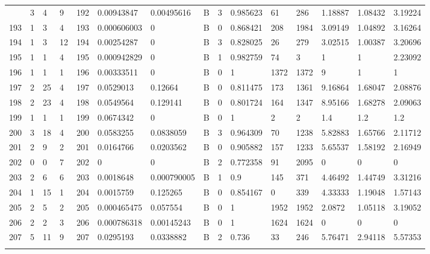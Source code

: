 \begin{latin}
\begin{longtable}{lllllllllllllll}
\begin{comment}
	192 & 3  & 4   & 9  & 192 & 0.00943847     & 0.00495616     & B & 3  & 0.985623 & 61   & 286  & 1.18887 & 1.08432 & 3.19224 \\
	193 & 1  & 3   & 4  & 193 & 0.000606003    & 0              & B & 0  & 0.868421 & 208  & 1984 & 3.09149 & 1.04892 & 3.16264 \\
	194 & 1  & 3   & 12 & 194 & 0.00254287     & 0              & B & 3  & 0.828025 & 26   & 279  & 3.02515 & 1.00387 & 3.20696 \\
	195 & 1  & 1   & 4  & 195 & 0.000942829    & 0              & B & 1  & 0.982759 & 74   & 3    & 1       & 1       & 2.23092 \\
	196 & 1  & 1   & 1  & 196 & 0.00333511     & 0              & B & 0  & 1        & 1372 & 1372 & 9       & 1       & 1       \\
	197 & 2  & 25  & 4  & 197 & 0.0529013      & 0.12664        & B & 0  & 0.811475 & 173  & 1361 & 9.16864 & 1.68047 & 2.08876 \\
	198 & 2  & 23  & 4  & 198 & 0.0549564      & 0.129141       & B & 0  & 0.801724 & 164  & 1347 & 8.95166 & 1.68278 & 2.09063 \\
	199 & 1  & 1   & 1  & 199 & 0.0674342      & 0              & B & 0  & 1        & 2    & 2    & 1.4     & 1.2     & 1.2     \\
	200 & 3  & 18  & 4  & 200 & 0.0583255      & 0.0838059      & B & 3  & 0.964309 & 70   & 1238 & 5.82883 & 1.65766 & 2.11712 \\
	201 & 2  & 9   & 2  & 201 & 0.0164766      & 0.0203562      & B & 0  & 0.905882 & 157  & 1233 & 5.65537 & 1.58192 & 2.16949 \\
	202 & 0  & 0   & 7  & 202 & 0              & 0              & B & 2  & 0.772358 & 91   & 2095 & 0       & 0       & 0       \\
	203 & 2  & 6   & 6  & 203 & 0.0018648      & 0.000790005    & B & 1  & 0.9      & 145  & 371  & 4.46492 & 1.44749 & 3.31216 \\
	204 & 1  & 15  & 1  & 204 & 0.0015759      & 0.125265       & B & 0  & 0.854167 & 0    & 339  & 4.33333 & 1.19048 & 1.57143 \\
	205 & 2  & 5   & 2  & 205 & 0.000465475    & 0.057554       & B & 0  & 1        & 1952 & 1952 & 2.0872  & 1.05118 & 3.19052 \\
	206 & 2  & 2   & 3  & 206 & 0.000786318    & 0.00145243     & B & 0  & 1        & 1624 & 1624 & 0       & 0       & 0       \\
	207 & 5  & 11  & 9  & 207 & 0.0295193      & 0.0338882      & B & 2  & 0.736    & 33   & 246  & 5.76471 & 2.94118 & 5.57353 \\

\end{comment}
\end{longtable}
\end{latin}
